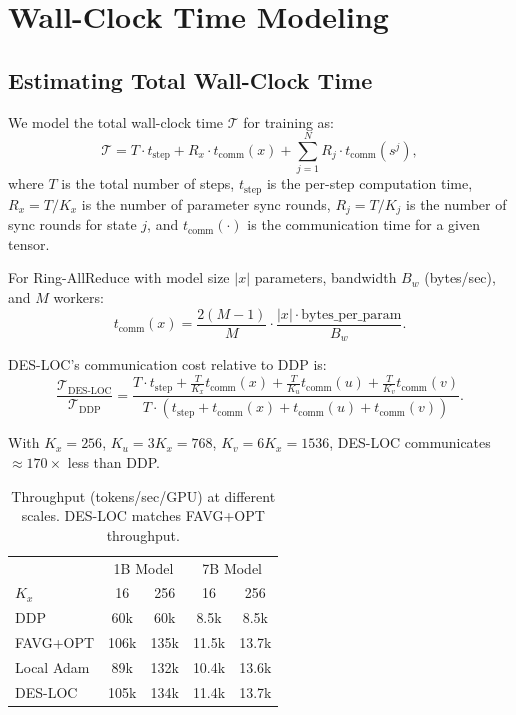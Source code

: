 \section{Wall-Clock Time Modeling}
\label{sec:wallclock_model}

\subsection{Estimating Total Wall-Clock Time}

We model the total wall-clock time $\mathcal{T}$ for training as:
\begin{equation}
\mathcal{T} = T \cdot t_{\text{step}} + R_x \cdot t_{\text{comm}}(x) + \sum_{j=1}^{N} R_j \cdot t_{\text{comm}}(s^j),
\end{equation}
where $T$ is the total number of steps, $t_{\text{step}}$ is the per-step computation time, $R_x = T/K_x$ is the number of parameter sync rounds, $R_j = T/K_j$ is the number of sync rounds for state $j$, and $t_{\text{comm}}(\cdot)$ is the communication time for a given tensor.

For Ring-AllReduce with model size $|x|$ parameters, bandwidth $B_w$ (bytes/sec), and $M$ workers:
\begin{equation}
t_{\text{comm}}(x) = \frac{2(M-1)}{M} \cdot \frac{|x| \cdot \text{bytes\_per\_param}}{B_w}.
\end{equation}

DES-LOC's communication cost relative to DDP is:
\begin{equation}
\frac{\mathcal{T}_{\text{DES-LOC}}}{\mathcal{T}_{\text{DDP}}} = \frac{T \cdot t_{\text{step}} + \frac{T}{K_x} t_{\text{comm}}(x) + \frac{T}{K_u} t_{\text{comm}}(u) + \frac{T}{K_v} t_{\text{comm}}(v)}{T \cdot (t_{\text{step}} + t_{\text{comm}}(x) + t_{\text{comm}}(u) + t_{\text{comm}}(v))}.
\end{equation}

With $K_x = 256$, $K_u = 3K_x = 768$, $K_v = 6K_x = 1536$, DES-LOC communicates $\approx 170\times$ less than DDP.

\begin{table}[h]
\centering
\caption{Throughput (tokens/sec/GPU) at different scales. DES-LOC matches FAVG+OPT throughput.}
\label{tab:throughput}
\begin{tabular}{l|cc|cc}
\toprule
& \multicolumn{2}{c|}{1B Model} & \multicolumn{2}{c}{7B Model} \\
$K_x$ & 16 & 256 & 16 & 256 \\
\midrule
DDP          & 60k & 60k & 8.5k & 8.5k \\
FAVG+OPT     & 106k & 135k & 11.5k & 13.7k \\
Local Adam   & 89k & 132k & 10.4k & 13.6k \\
DES-LOC      & 105k & 134k & 11.4k & 13.7k \\
\bottomrule
\end{tabular}
\end{table}

